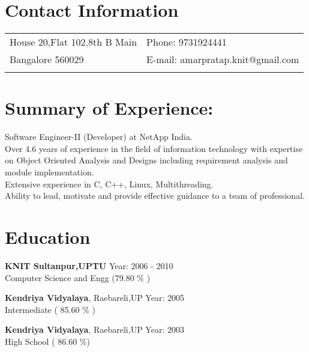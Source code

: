 \documentclass[margin,line]{res}
\begin{document}


\begin{resume}
\section{\sc Contact Information}

\vspace{.05in}
\begin{tabular}{@{}p{3.5in}p{3in}}
House 20,Flat 102,8th B Main             & {Phone:}  9731924441 \\
Bangalore 560029                               & {E-mail:}  amarpratap.knit@gmail.com\\
\\
\end{tabular}


\section{\sc Summary of Experience:}
Software Engineer-II (Developer) at NetApp India. \\
Over 4.6 years of experience in the field of information technology with expertise on Object Oriented Analysis and Designs including requirement analysis and module implementation.\\
Extensive experience in C, C++, Linux, Multithreading.\\
Ability to lead, motivate and provide effective guidance to a team of professional.\\




\section{\sc Education}
{\bf KNIT Sultanpur,UPTU} \hfill Year: 2006 - 2010\\
Computer Science and Engg \hfill(79.80 \% )

{\bf Kendriya Vidyalaya}, Raebareli,UP \hfill Year: 2005 \\
Intermediate \hfill( 85.60 \% )

{\bf Kendriya Vidyalaya}, Raebareli,UP \hfill Year: 2003 \\
High School \hfill( 86.60 \%)


\end{resume}
\end{document}
